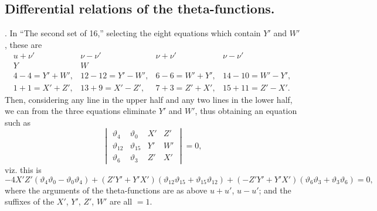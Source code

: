 \documentclass[11pt,a4paper]{book}
\begin{document}
\subsection*{Differential relations of the theta-functions.}

. In ``The second set of 16,'' selecting the eight equations which contain $Y'$ and $W'$, these are
\[
\begin{array}{c|c|c|c}
u + \nu' & \nu - \nu' & \nu + \nu' & \nu - \nu' \\
\hline
Y & W & & \\
\hline
4 - 4 = Y' + W', & 12 - 12 = Y' - W', & 6 - 6 = W' + Y', & 14 - 10 = W' - Y', \\
1 + 1 = X' + Z', & 13 + 9 = X' - Z', & 7 + 3 = Z' + X', & 15 + 11 = Z' - X'.
\end{array}
\]
Then, considering any line in the upper half and any two lines in the lower half, we can from the three equations eliminate $Y'$ and $W'$, thus obtaining an equation such as
\[
\begin{vmatrix}
\vartheta_4 & \vartheta_0 & X' & Z' \\
\vartheta_{12} & \vartheta_{15} & Y' & W' \\
\vartheta_6 & \vartheta_3 & Z' & X'
\end{vmatrix}
= 0,
\]
viz. this is
\[
-4X'Z'(\vartheta_4 \vartheta_0 - \vartheta_0 \vartheta_4) + (Z'Y' + Y'X')(\vartheta_{12} \vartheta_{15} + \vartheta_{15} \vartheta_{12}) + (-Z'Y' + Y'X')(\vartheta_6 \vartheta_3 + \vartheta_3 \vartheta_6) = 0,
\]
where the arguments of the theta-functions are as above $u+u'$, $u-u'$; and the suffixes of the $X'$, $Y'$, $Z'$, $W'$ are all $= 1$.

\newpage
\setcounter{page}{561}
\end{document}

